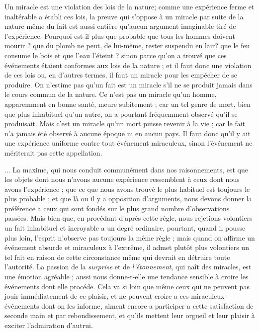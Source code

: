 Un miracle est une violation des lois de la nature;
comme une expérience ferme et inaltérable a établi ces
lois, la preuve qui s’oppose à un miracle par suite de la
nature même du fait est aussi entière qu’aucun argument
imaginable tiré de l’expérience. Pourquoi est-il plus que
probable que tous les hommes doivent mourir ? que du
plomb ne peut, de lui-même, rester suspendu en lair?
que le feu consume le bois et que l’eau l’éteint ? sinon
parce qu’on a trouvé que ces événements étaient conformes
aux lois de la nature ; et il faut donc une violation de ces
lois ou, en d’autres termes, il faut un miracle pour les
empécher de se produire. On n’estime pas qu’un fait est un
miracle s’il ne se produit jamais dans le cours commun de
la nature. Ce n’est pas un miracle qu’un homme, apparemment 
en bonne santé, meure subitement ; car un tel genre
de mort, bien que plus inhabituel qu’un autre, on a pourtant
fréquemment observé qu’il se produisait. Mais c’est
un miracle qu’un mort puisse revenir à la vie ; car le fait
n’a jamais été observé à aucune époque ni en aucun pays.
Il faut donc qu’il y ait une expérience uniforme contre
tout événement miraculeux, sinon l’événement ne mériterait
pas cette appellation.

... La maxime, qui nous conduit communément dans
nos raisonnements, est que les objets dont nous n’avons
aucune expérience ressemblent à ceux dont nous avons
l'expérience ; que ce que nous avons trouvé le plus habituel
est toujours le plus probable ; et que là ou il y a opposition
d’arguments, nous devons donner la préférence a ceux
qui sont fondés sur le plus grand nombre d’observations
passées. Mais bien que, en procédant d’aprés cette règle,
nous rejetions volontiers un fait inhabituel et incroyable
a un degré ordinaire, pourtant, quand il pousse plus loin,
l'esprit n’observe pas toujours la même règle ; mais quand
on affirme un événement absurde et miraculeux à l’extrême,
il admet plutôt plus volontiers un tel fait en raison de
cette circonstance même qui devrait en détruire toute
l'autorité. La passion de la {\it surprise} et de {\it l’étonnement},
qui naît des miracles, est une émotion agréable ; aussi
nous donne-t-elle une tendance sensible à croire les événements
dont elle procéde. Cela va si loin que même
ceux qui ne peuvent pas jouir immédiatement de ce
plaisir, et ne peuvent croire a ces miraculeux événements
dont on les informe, aiment encore a participer a cette
satisfaction de seconde main et par rebondissement, et
qu'ils mettent leur orgueil et leur plaisir à exciter l'admiration
d’autrui.

